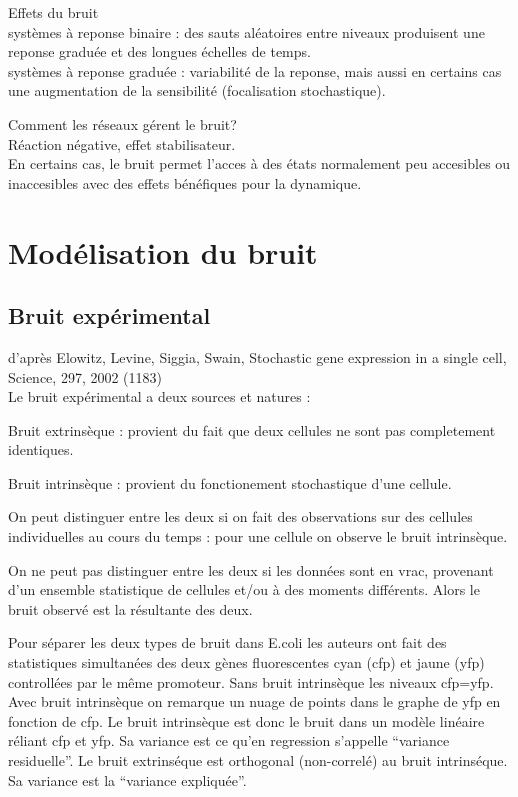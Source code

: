 \documentclass{article}
\def\red{\color{red}}
\def\magenta{\color{goldenrod}}
\begin{document}
{\red Effets du bruit} \\

syst{\`e}mes {\`a} reponse binaire : des sauts al{\'e}atoires entre niveaux
produisent une
reponse gradu{\'e}e et des longues {\'e}chelles de temps. \\

syst{\`e}mes {\`a} reponse gradu{\'e}e : variabilit{\'e} de la reponse, mais aussi
en certains cas une augmentation de la sensibilit{\'e} (focalisation
stochastique).

{\red Comment les r{\'e}seaux g{\'e}rent le bruit? }\\

R{\'e}action n{\'e}gative, effet stabilisateur. \\

En certains cas, le bruit permet l'acces {\`a} des {\'e}tats normalement
peu accesibles ou inaccesibles avec des effets b{\'e}n{\'e}fiques pour la
dynamique.


\chapter{\magenta \textsf{\huge Mod{\'e}lisation du bruit }}

\section{\magenta \textsf{\Large Bruit exp{\'e}rimental }}

{\large
d'apr{\`e}s Elowitz, Levine, Siggia, Swain,  \textsf{Stochastic gene
expression in a single cell}, Science, 297, 2002 (1183)} \\


Le bruit exp{\'e}rimental a deux sources et natures :


Bruit extrins{\`e}que : provient du fait que deux cellules ne sont pas completement
identiques.

Bruit intrins{\`e}que : provient du fonctionement stochastique d'une cellule.

On peut distinguer entre les deux si on fait des observations sur des
cellules individuelles au cours du temps : pour une cellule on observe le bruit
intrins{\`e}que.

On ne peut pas distinguer entre les deux si les donn{\'e}es sont en vrac, provenant
d'un ensemble statistique de cellules et/ou {\`a} des moments diff{\'e}rents.
Alors le bruit observ{\'e} est la r{\'e}sultante
des deux.

Pour s{\'e}parer les deux types de bruit dans E.coli les auteurs ont
fait des statistiques simultan{\'e}es des deux g{\`e}nes fluorescentes
cyan (cfp) et jaune (yfp) controll{\'e}es par le m{\^e}me promoteur. Sans
bruit intrins{\`e}que les niveaux cfp=yfp. Avec bruit intrins{\`e}que on
remarque un nuage de points dans le graphe de yfp en fonction de
cfp. Le bruit intrins{\`e}que est donc le bruit dans un mod{\`e}le
lin{\'e}aire r{\'e}liant cfp et yfp. Sa variance est ce qu'en regression 
s'appelle ``variance residuelle''. Le bruit extrins{\'e}que est orthogonal 
(non-correl{\'e}) au bruit intrins{\'e}que. Sa variance est la
``variance expliqu{\'e}e''.  
\end{document}

